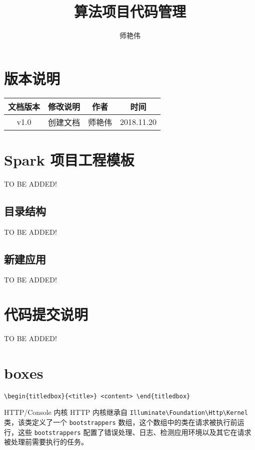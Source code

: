 \documentclass{progartcn}
\title{\bfseries\sffamily
  算法项目代码管理
}
\author{师艳伟}
\begin{document}
\maketitle      %


\sloppy %


\tableofcontents
\thispagestyle{empty} %

\mainmatter           %
\renewcommand{\thesection}{\arabic{section}}

\section{版本说明}
\begin{table}[!ht]
  \centering
  \begin{tabular}{|c|c|c|c|}
  \hline
  文档版本 & 修改说明 & 作者 & 时间	\\
  \hline
  v1.0 & 创建文档 & 师艳伟 & 2018.11.20		\\
  \hline
  \end{tabular}
\end{table}

\section{Spark 项目工程模板}
TO BE ADDED!
\subsection{目录结构}
TO BE ADDED!
\subsection{新建应用}
TO BE ADDED!

\section{代码提交说明}

TO BE ADDED!


\section{boxes}

\noindent\verb|\begin{titledbox}{<title>} <content> \end{titledbox}|

\begin{titledbox}{HTTP/Console 内核}
  HTTP 内核继承自 \verb|Illuminate\Foundation\Http\Kernel| 类，该类定义了一个 \verb|bootstrappers| 数组，这个数组中的类在请求被执行前运行，这些 \verb|bootstrappers| 配置了错误处理、日志、检测应用环境以及其它在请求被处理前需要执行的任务。
\end{titledbox}
\end{document}
